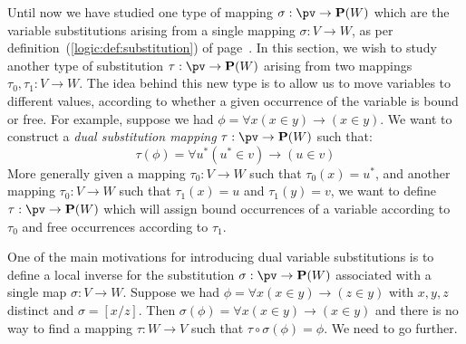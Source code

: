 Until now we have studied one type of mapping $\sigma:\pv\to{\bf
P}(W)$ which are the variable substitutions arising from a single
mapping $\sigma:V\to W$, as per
definition~(\ref{logic:def:substitution}) of
page~\pageref{logic:def:substitution}. In this section, we wish to
study another type of substitution $\tau:\pv\to{\bf P}(W)$ arising
from two mappings $\tau_{0},\tau_{1}:V\to W$. The idea behind this
new type is to allow us to move variables to different values,
according to whether a given occurrence of the variable  is bound or
free. For example, suppose we had $\phi=\forall x(x\in y)\to(x\in
y)$. We want to construct a {\em dual substitution mapping}
$\tau:\pv\to{\bf P}(W)$ such that:
    \[
    \tau(\phi)=\forall u^{*}(u^{*}\in v)\to(u\in v)
    \]
More generally given a mapping $\tau_{0}:V\to W$ such that
$\tau_{0}(x)=u^{*}$, and another mapping  $\tau_{0}:V\to W$
such that $\tau_{1}(x)=u$ and $\tau_{1}(y)=v$, we want to define
$\tau:\pv\to{\bf P}(W)$ which will assign bound occurrences of a
variable according to $\tau_{0}$ and free occurrences according to
$\tau_{1}$.

One of the main motivations for introducing dual variable
substitutions is to define a local inverse for the substitution
$\sigma:\pv\to{\bf P}(W)$ associated with a single map $\sigma:V\to
W$. Suppose we had $\phi=\forall x(x\in y)\to(z\in y)$ with $x,y,z$
distinct and $\sigma=[x/z]$. Then $\sigma(\phi)=\forall x(x\in
y)\to(x\in y)$ and there is no way to find a mapping $\tau:W\to V$
such that $\tau\circ\sigma(\phi)=\phi$. We need to go further.

